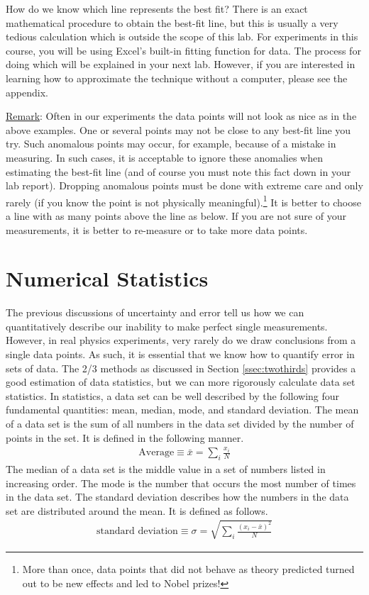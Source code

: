 \documentclass[letterpaper, 12pt]{book}
\newcommand{\myskip}{\vspace{0.5\baselineskip}}
\begin{document}
How do we know which line represents the best fit? There is an exact mathematical procedure to obtain the best-fit line, but this is usually a very tedious calculation which is outside the scope of this lab. For experiments in this course, you will be using Excel's built-in fitting function for data. The process for doing which will be explained in your next lab. However, if you are interested in learning how to approximate the technique without a computer, please see the appendix.\myskip

\underline{Remark}: Often in our experiments the data points will not look as nice as in the above examples. One or several points may not be close to any best-fit line you try. Such anomalous points may occur, for example, because of a mistake in measuring. In such cases, it is acceptable to ignore these anomalies when estimating the best-fit line (and of course you must note this fact down in your lab report).  Dropping anomalous points must be done with extreme care and only rarely (if you know the point is not physically meaningful).\footnote{More than once, data points that did not behave as theory predicted turned out to be new effects and led to Nobel prizes!}  It is better to choose a line with as many points above the line as below. If you are not sure of your measurements, it is better to re-measure or to take more data points. \myskip

\section{Numerical Statistics}
The previous discussions of uncertainty and error tell us how we can quantitatively describe our inability to make perfect single measurements. However, in real physics experiments, very rarely do we draw conclusions from a single data points. As such, it is essential that we know how to quantify error in sets of data. The 2/3 methods as discussed in Section \ref{ssec:twothirds} provides a good estimation of data statistics, but we can more rigorously calculate data set statistics. In statistics, a data set can be well described by the following four fundamental quantities: mean, median, mode, and standard deviation. The mean of a data set is the sum of all numbers in the data set divided by the number of points in the set. It is defined in the following manner.
\begin{gather}
 \text{Average} \equiv \bar x= \sum_{i} \frac{x_i}{N}
\end{gather}
The median of a data set is the middle value in a set of numbers listed in increasing order. The mode is the number that occurs the most number of times in the data set. The standard deviation describes  how the numbers in the data set are distributed around the mean. It is defined as follows.
\begin{gather}
\text{standard deviation} \equiv \sigma = \sqrt{\sum_i \frac{(x_i - \bar x)^2}{N}}
\end{gather}
\end{document}
